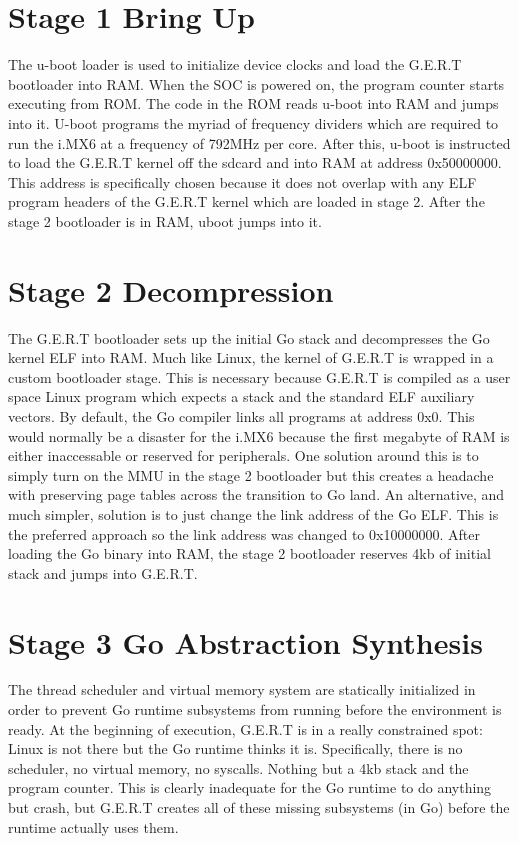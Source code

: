 \section{Stage 1 Bring Up}
The u-boot loader is used to initialize device clocks and load the G.E.R.T bootloader into RAM.
When the SOC is powered on, the program counter starts executing from ROM. The code in the ROM reads
u-boot into RAM and jumps into it. U-boot programs the myriad of frequency dividers which are required
to run the i.MX6 at a frequency of 792MHz per core. After this, u-boot is instructed to load the G.E.R.T
kernel off the sdcard and into RAM at address 0x50000000. This address is specifically chosen because it
does not overlap with any ELF program headers of the G.E.R.T kernel which are loaded in stage 2. After
the stage 2 bootloader is in RAM, uboot jumps into it.

\section{Stage 2 Decompression}
The G.E.R.T bootloader sets up the initial Go stack and decompresses the Go kernel
ELF into RAM. Much like Linux, the kernel of G.E.R.T is wrapped in a custom
bootloader stage. This is necessary because G.E.R.T is compiled as a user space
Linux program which expects a stack and the standard ELF auxiliary vectors. By
default, the Go compiler links all programs at address 0x0. This would normally
be a disaster for the i.MX6 because the first megabyte of RAM is either inaccessable
or reserved for peripherals. One solution around this is to simply turn on the MMU
in the stage 2 bootloader but this creates a headache with preserving page tables
across the transition to Go land. An alternative, and much simpler, solution is to
just change the link address of the Go ELF. This is the preferred approach so
the link address was changed to 0x10000000. After loading the Go binary into RAM,
the stage 2 bootloader reserves 4kb of initial stack and jumps into G.E.R.T.

\section{Stage 3 Go Abstraction Synthesis}
The thread scheduler and virtual memory system are statically initialized
in order to prevent Go runtime subsystems from running before the environment
is ready. At the beginning of execution, G.E.R.T is in a really constrained
spot: Linux is not there but the Go runtime thinks it is. Specifically, there
is no scheduler, no virtual memory, no syscalls. Nothing but a 4kb stack
and the program counter. This is clearly inadequate for the Go runtime
to do anything but crash, but G.E.R.T creates all of these missing subsystems
(in Go) before the runtime actually uses them.

